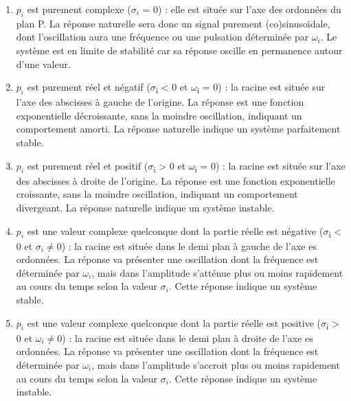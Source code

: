 	
	\begin{enumerate}
		\item $p_{i}$ est purement complexe ($\sigma_{i}$ = 0) : elle est située sur l'axe des ordonnées du plan P. La réponse  naturelle sera donc un signal purement (co)sinusoïdale, dont l'oscillation aura une fréquence ou une pulsation déterminée par $\omega_{i}$. Le système est en limite de stabilité car sa réponse oscille en permanence autour d'une valeur.
		\item $p_{i}$ est purement réel et négatif ($ \sigma $\textsubscript{i} \textless{} 0 et 		$ \omega $\textsubscript{i} = 0) : la racine est située sur l'axe des abscisses à 		gauche de l'origine. La réponse est une fonction exponentielle 		décroissante, sans la moindre oscillation, indiquant un comportement	amorti. La réponse naturelle indique un système parfaitement stable.
		\item $p_{i}$ est purement réel et positif ($ \sigma $\textsubscript{i} \textgreater{} 0 et $ \omega $\textsubscript{i} = 0) : la racine est située sur l'axe des abscisses à droite de l'origine. La réponse est une fonction exponentielle croissante, sans la moindre oscillation, indiquant un comportement divergeant. La réponse naturelle indique un système instable.
		\item $p_{i}$ est une valeur complexe quelconque dont la partie réelle est négative ($ \sigma $\textsubscript{i} \textless{} 0 et  $ \sigma_{i} \neq 0 $) : la racine 	est située dans le demi plan à gauche de l'axe es ordonnées. La réponse va présenter une oscillation dont la fréquence est déterminée par $ \omega_{i}$, mais dans l'amplitude s'atténue plus ou moins rapidement au cours du temps selon la valeur  $ \sigma_{i} $. Cette réponse indique un système stable.
		\item $p_{i}$ est une valeur complexe quelconque dont la partie réelle est positive ($ \sigma $\textsubscript{i} \textgreater{} 0 et $ \omega_{i} \neq 0 $) : la racine est située dans le demi plan à droite de l'axe es ordonnées. La réponse va présenter une oscillation dont la fréquence est déterminée par $ \omega_{i} $, mais dans l'amplitude s'accroit plus ou moins rapidement au cours du temps selon la valeur  $ \sigma_{i} $. Cette réponse indique	un système instable.
		

	\end{enumerate}
	
